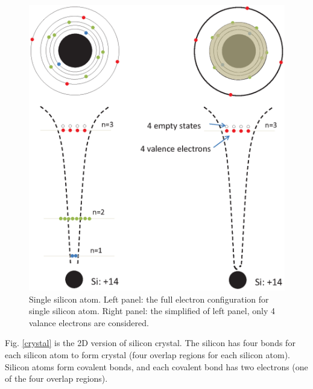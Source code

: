 \documentclass[a4paper, 12pt, titlepage,oneside,drop]{kthesis}
\begin{document}
\begin{figure}[H]
\centering
\includegraphics[scale=.45]{singleatom}
\caption{Single silicon atom. Left panel: the full electron configuration for single silicon atom. Right panel: the simplified of left panel, only 4 valance electrons are considered.}
\label{singleatom}
\end{figure}

Fig. \ref{crystal} is the 2D version of silicon crystal.
The silicon has four bonds for each silicon atom to form crystal (four overlap regions for each silicon atom). Silicon atoms form covalent bonds, and each covalent bond
has two electrons (one of the four overlap regions).
 
\end{document}
